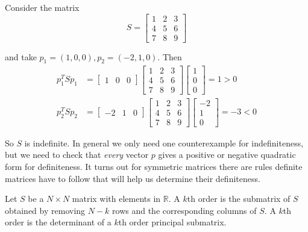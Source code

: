 \documentclass{article}
\begin{document}
\begin{example}
  Consider the matrix
  \[
    S = \left[\begin{matrix}
      1 & 2 & 3 \\
      4 & 5 & 6 \\
      7 & 8 & 9
    \end{matrix}\right]
  \]

  and take $p_1 = (1, 0, 0), p_2 = (-2, 1, 0)$. Then
  \begin{align*}
    p_1^T S p_1
    &
    =
    \left[\begin{matrix}
      1 & 0 & 0
    \end{matrix}\right]
    \left[\begin{matrix}
      1 & 2 & 3 \\
      4 & 5 & 6 \\
      7 & 8 & 9
    \end{matrix}\right]
    \left[\begin{matrix}
      1 \\ 0 \\ 0
    \end{matrix}\right]
    =
    1
    >
    0
    \\
    p_2^T S p_2
    &
    =
    \left[\begin{matrix}
      -2 & 1 & 0
    \end{matrix}\right]
    \left[\begin{matrix}
      1 & 2 & 3 \\
      4 & 5 & 6 \\
      7 & 8 & 9
    \end{matrix}\right]
    \left[\begin{matrix}
      -2 \\ 1 \\ 0
    \end{matrix}\right]
    =
    -3
    <
    0
  \end{align*}

  So $S$ is indefinite. In general we only need one counterexample for indefiniteness, but we need to check that \textit{every} vector $p$ gives a positive or negative quadratic form for definiteness. It turns out for symmetric matrices there are rules definite matrices have to follow that will help us determine their definiteness.
\end{example}

\begin{definition}
  Let $S$ be a $N \times N$ matrix with elements in $\mathbb{R}$. A $k$th order  is the submatrix of $S$ obtained by removing $N - k$ rows and the corresponding columns of $S$. A $k$th order  is the determinant of a $k$th order principal submatrix.
\end{definition}
\end{document}
